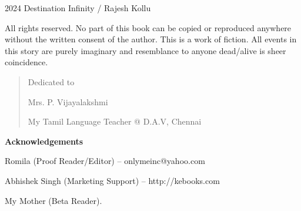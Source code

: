 \begin{center}
\HUGE{\thetitle}
\end{center}
\cleardoublepage

\begin{center}
\HUGE{\thetitle}
\end{center}

\begin{center}
\LARGE\textsf{\theauthor}
\end{center}
\clearpage

\begingroup
\footnotesize
\setlength{\parindent}{0pt}
\setlength{\parskip}{\baselineskip}

\textcopyright{} 2024 Destination Infinity / Rajesh Kollu

All rights reserved. No part of this book can be copied or reproduced anywhere
without the written consent of the author. This is a work of fiction. All events
in this story are purely imaginary and resemblance to anyone dead/alive is sheer
coincidence.

\endgroup
\clearpage

\begin{quote}
\begin{center}Dedicated to

\LARGE
Mrs. P. Vijayalakshmi
\normalsize

My Tamil Language Teacher @ D.A.V, Chennai
\end{center}
\end{quote}

\vfill

\textbf{Acknowledgements}

Romila (Proof Reader/Editor) – onlymeinc@yahoo.com


Abhishek Singh (Marketing Support) – http://kebooks.com

My Mother (Beta Reader).


\clearpage